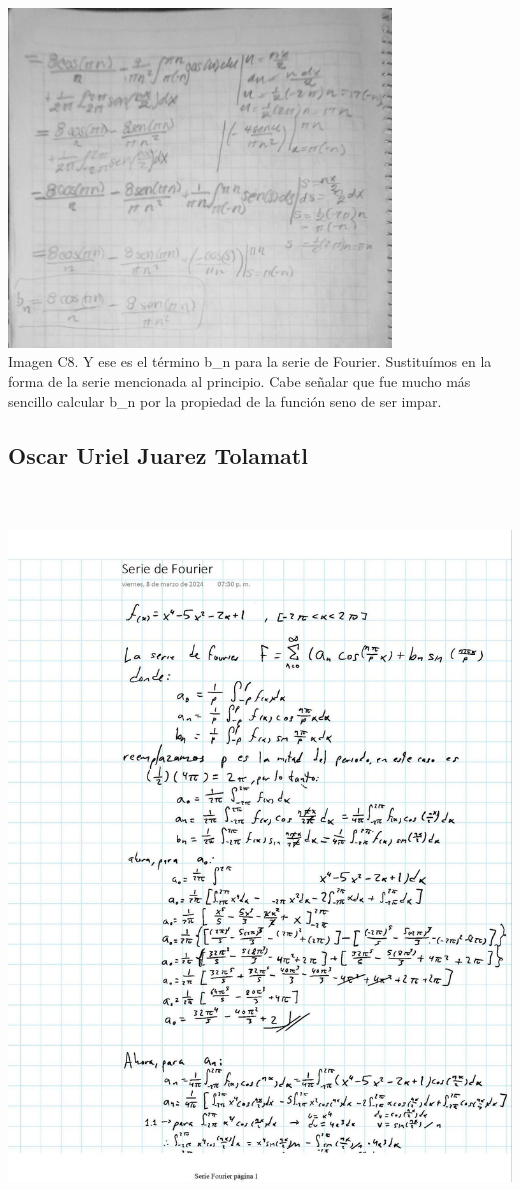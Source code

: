 \includegraphics[width=4.00521in,height=3.53949in]{media/image41.jpg}\\ Imagen C8. Y ese es el término b\_n para la serie de Fourier. Sustituímos en la forma de la serie mencionada al principio. Cabe señalar que fue mucho más sencillo calcular b\_n por la propiedad de la función seno de ser impar.

\subsection{Oscar Uriel Juarez Tolamatl}\label{oscar-uriel-juarez-tolamatl}

\includegraphics[width=5.93125in,height=7.67516in]{media/image59.jpg}

